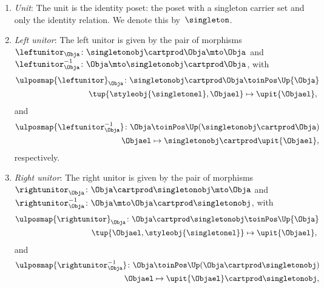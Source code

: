 \begin{lemma}
\begin{enumerate}
        \item \emph{Unit}: The unit is the identity poset: the poset with a singleton carrier set and only the identity relation.
        We denote this by~$\singleton$.
        \item \emph{Left unitor}: The left unitor is given by the pair of morphisms~$\leftunitor_\Obja\colon \singletonobj\cartprod \Obja \mto \Obja$ and~$\leftunitor_\Obja^{-1}\colon \Obja \mto \singletonobj\cartprod \Obja$, with
        \begin{equation}
            \begin{aligned}
                \ulposmap{\leftunitor}_\Obja\colon \singletonobj\cartprod \Obja &\toinPos \Up{\Obja}\\
                \tup{\styleobj{\singletonel},\Objael}&\mapsto \upit\{\Objael\},
            \end{aligned}
        \end{equation}
        and
        \begin{equation}
            \begin{aligned}
                \ulposmap{\leftunitor_{\Obja}^{-1}}\colon \Obja &\toinPos \Up(\singletonobj\cartprod \Obja) \\
                \Objael&\mapsto \singletonobj \cartprod \upit \{\Objael\},
            \end{aligned}
        \end{equation}
        respectively.
        \item \emph{Right unitor}: The right unitor is given by the pair of morphisms~$\rightunitor_\Obja\colon \Obja\cartprod \singletonobj  \mto \Obja$ and~$\rightunitor_\Obja^{-1}\colon \Obja \mto \Obja \cartprod \singletonobj$, with
        \begin{equation}
            \begin{aligned}
                \ulposmap{\rightunitor}_\Obja\colon \Obja\cartprod \singletonobj  &\toinPos \Up{\Obja}\\
                \tup{\Objael,\styleobj{\singletonel}}&\mapsto \upit\{\Objael\},
            \end{aligned}
        \end{equation}
        and
        \begin{equation}
            \begin{aligned}
                \ulposmap{\rightunitor_{\Obja}^{-1}}\colon \Obja &\toinPos \Up( \Obja \cartprod \singletonobj) \\
                \Objael&\mapsto \upit \{\Objael\} \cartprod \singletonobj,

\end{aligned}
\end{equation}
\end{enumerate}
\end{lemma}
